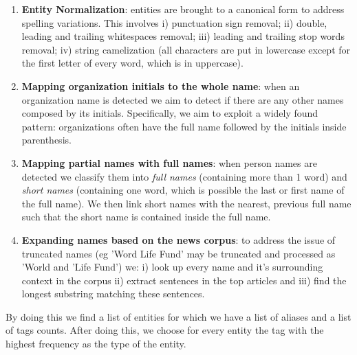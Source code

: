 \begin{enumerate}

\item \textbf{Entity Normalization}: entities are brought to a canonical form to address spelling variations. This involves i) punctuation sign removal; ii) double, leading and trailing whitespaces removal; iii) leading and trailing stop words removal; iv) string camelization (all characters are put in lowercase except for the first letter of every word, which is in uppercase). 

\item \textbf{Mapping organization initials to the whole name}: when an organization name is detected we aim to detect if there are any other names composed by its initials. Specifically, we aim to exploit a widely found pattern: organizations often have the full name followed by the initials inside parenthesis. 

\item \textbf{Mapping partial names with full names}: when person names are detected we classify them into \emph{full names} (containing more than 1 word) and \emph{short names} (containing one word, which is possible the last or first name of the full name). We then link short names with the nearest, previous full name such that the short name is contained inside the full name.

\item \textbf{Expanding names based on the news corpus}: to address the issue of truncated names (eg 'Word Life Fund' may be truncated and processed as 'World and 'Life Fund')  we: i) look up every name and it's surrounding context in the corpus ii) extract sentences in the top articles and iii) find the longest substring matching these sentences. 
\end{enumerate}

By doing this we find a list of entities for which we have a list of aliases and a list of tags counts. After doing this, we choose for every entity the tag with the highest frequency as the type of the entity. \\


